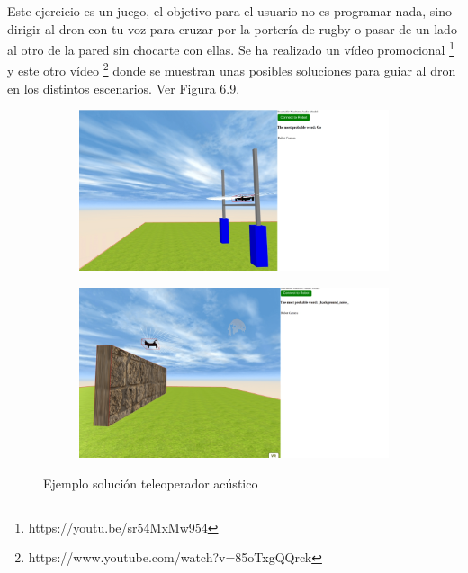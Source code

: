 Este ejercicio es un juego, el objetivo para el usuario no es programar nada, sino dirigir al dron con tu voz para cruzar por la portería de rugby o pasar de un lado al otro de la pared sin chocarte con ellas. Se ha realizado un vídeo promocional \footnote{https://youtu.be/sr54MxMw954} y este otro vídeo \footnote{https://www.youtube.com/watch?v=85oTxgQQrck} donde se muestran unas posibles soluciones para guiar al dron en los distintos escenarios. Ver Figura 6.9.

 \begin{figure}[H]
  \begin{subfigure}[b]{0.5\textwidth}
  \centering
    \includegraphics[width=1\textwidth, height=0.7\textwidth]{chapters/images/solucionaudio.png}
    \caption{}
    \label{fig:f1}
  \end{subfigure}
  \hfill
  \begin{subfigure}[b]{0.5\textwidth}
  \centering
    \includegraphics[width=1\textwidth, height=0.7\textwidth]{chapters/images/solucionaudio2.png}
	\caption{}    
    \label{fig:f2}
 
  \end{subfigure}
  \caption{Ejemplo solución teleoperador acústico}
\end{figure}


